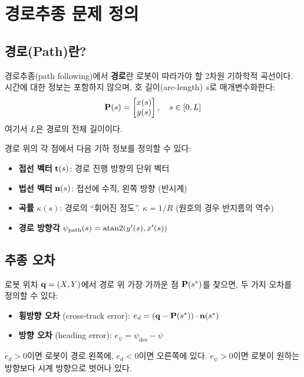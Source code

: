 \section{경로추종 문제 정의}
\label{sec:problem}

\subsection{경로(Path)란?}

경로추종(path following)에서 \textbf{경로}란 로봇이 따라가야 할 2차원 기하학적 곡선이다.
시간에 대한 정보는 포함하지 않으며, 호 길이(arc-length) $s$로 매개변수화한다:
\begin{equation}
    \mathbf{P}(s) = \begin{bmatrix} x(s) \\ y(s) \end{bmatrix}, \quad s \in [0, L]
\end{equation}
여기서 $L$은 경로의 전체 길이이다.

경로 위의 각 점에서 다음 기하 정보를 정의할 수 있다:
\begin{itemize}[nosep]
    \item \textbf{접선 벡터} $\mathbf{t}(s)$: 경로 진행 방향의 단위 벡터
    \item \textbf{법선 벡터} $\mathbf{n}(s)$: 접선에 수직, 왼쪽 방향 (반시계)
    \item \textbf{곡률} $\kappa(s)$: 경로의 ``휘어진 정도''. $\kappa = 1/R$ (원호의 경우 반지름의 역수)
    \item \textbf{경로 방향각} $\psi_\text{path}(s) = \operatorname{atan2}(y'(s), x'(s))$
\end{itemize}

\subsection{추종 오차}

로봇 위치 $\mathbf{q} = (X, Y)$에서 경로 위 가장 가까운 점 $\mathbf{P}(s^*)$를 찾으면,
두 가지 오차를 정의할 수 있다:

\begin{itemize}[nosep]
    \item \textbf{횡방향 오차} (cross-track error): $e_d = (\mathbf{q} - \mathbf{P}(s^*)) \cdot \mathbf{n}(s^*)$
    \item \textbf{방향 오차} (heading error): $e_\psi = \psi_\text{des} - \psi$
\end{itemize}

$e_d > 0$이면 로봇이 경로 왼쪽에, $e_d < 0$이면 오른쪽에 있다.
$e_\psi > 0$이면 로봇이 원하는 방향보다 시계 방향으로 벗어나 있다.

